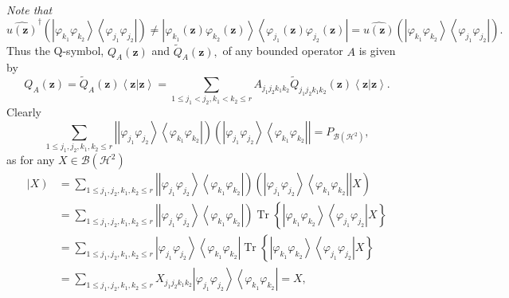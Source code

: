 \documentclass[aps,preprint]{revtex4}%
\begin{document}
\emph{Note that}
\begin{equation}
\widehat{u\left(  \mathbf{z}\right)  }^{\dagger}\left(  \left\vert
\varphi_{k_{1}}\varphi_{k_{2}}\right\rangle \left\langle \varphi_{j_{1}%
}\varphi_{j_{2}}\right\vert \right)  \neq\left\vert \varphi_{k_{1}}\left(
\mathbf{z}\right)  \varphi_{k_{2}}\left(  \mathbf{z}\right)  \right\rangle
\left\langle \varphi_{j_{1}}\left(  \mathbf{z}\right)  \varphi_{j_{2}}\left(
\mathbf{z}\right)  \right\vert =\widehat{u\left(  \mathbf{z}\right)  }\left(
\left\vert \varphi_{k_{1}}\varphi_{k_{2}}\right\rangle \left\langle
\varphi_{j_{1}}\varphi_{j_{2}}\right\vert \right)  .
\end{equation}
Thus the Q-symbol, $Q_{A}\left(  \mathbf{z}\right)  $ and $\tilde{Q}%
_{A}\left(  \mathbf{z}\right)  ,$ of any bounded operator $A$ is given by
\begin{equation}
Q_{A}\left(  \mathbf{z}\right)  =\tilde{Q}_{A}\left(  \mathbf{z}\right)
\left\langle \mathbf{z}\left\vert \mathbf{z}\right.  \right\rangle
=\sum_{1\leq j_{1}<j_{2},k_{1}<k_{2}\leq r}A_{j_{1}j_{2}k_{1}k_{2}}\tilde
{Q}_{j_{1}j_{2}k_{1}k_{2}}\left(  \mathbf{z}\right)  \left\langle
\mathbf{z}\left\vert \mathbf{z}\right.  \right\rangle .
\end{equation}
Clearly
\begin{equation}
\sum_{1\leq j_{1},j_{2},k_{1},k_{2}\leq r}\left\vert \left\vert \varphi
_{j_{1}}\varphi_{j_{2}}\right\rangle \left\langle \varphi_{k_{1}}%
\varphi_{k_{2}}\right\vert \right)  \left(  \left\vert \varphi_{j_{1}}%
\varphi_{j_{2}}\right\rangle \left\langle \varphi_{k_{1}}\varphi_{k_{2}%
}\right\vert \right\vert =P_{\mathcal{B}\left(  \mathcal{H}^{2}\right)  },
\end{equation}
as for any $X\in\mathcal{B}\left(  \mathcal{H}^{2}\right)  $
\begin{align}
\left\vert X\right)   &  =\sum_{1\leq j_{1},j_{2},k_{1},k_{2}\leq r}\left\vert
\left\vert \varphi_{j_{1}}\varphi_{j_{2}}\right\rangle \left\langle
\varphi_{k_{1}}\varphi_{k_{2}}\right\vert \right)  \left(  \left.  \left\vert
\varphi_{j_{1}}\varphi_{j_{2}}\right\rangle \left\langle \varphi_{k_{1}%
}\varphi_{k_{2}}\right\vert \right\vert X\right)  \nonumber\\
&  =\sum_{1\leq j_{1},j_{2},k_{1},k_{2}\leq r}\left\vert \left\vert
\varphi_{j_{1}}\varphi_{j_{2}}\right\rangle \left\langle \varphi_{k_{1}%
}\varphi_{k_{2}}\right\vert \right)  \operatorname*{Tr}\left\{  \left\vert
\varphi_{k_{1}}\varphi_{k_{2}}\right\rangle \left\langle \varphi_{j_{1}%
}\varphi_{j_{2}}\right\vert X\right\}  \nonumber\\
&  =\sum_{1\leq j_{1},j_{2},k_{1},k_{2}\leq r}\left\vert \varphi_{j_{1}%
}\varphi_{j_{2}}\right\rangle \left\langle \varphi_{k_{1}}\varphi_{k_{2}%
}\right\vert \operatorname*{Tr}\left\{  \left\vert \varphi_{k_{1}}%
\varphi_{k_{2}}\right\rangle \left\langle \varphi_{j_{1}}\varphi_{j_{2}%
}\right\vert X\right\}  \nonumber\\
&  =\sum_{1\leq j_{1},j_{2},k_{1},k_{2}\leq r}X_{j_{1}j_{2}k_{1}k_{2}%
}\left\vert \varphi_{j_{1}}\varphi_{j_{2}}\right\rangle \left\langle
\varphi_{k_{1}}\varphi_{k_{2}}\right\vert =X,
\end{align}
\end{document}
